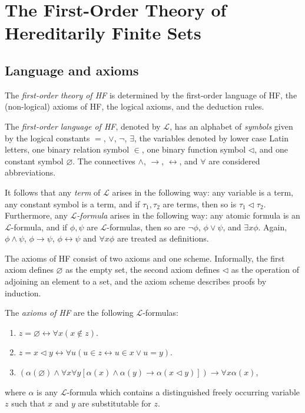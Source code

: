 \chapter{The First-Order Theory of Hereditarily Finite Sets}

\section{Language and axioms}

The \textit{first-order theory of HF} is determined by the first-order language of HF, 
the (non-logical) axioms of HF, the logical axioms, and the deduction rules.

\begin{definition}
    \label{def:Lang}
    \leanok
    The \textit{first-order language of HF}, denoted by $\mathcal{L}$, 
    has an alphabet of \textit{symbols} given by the 
    logical constants $=$, $\lor$, $\neg$, $\exists$, the variables denoted by 
    lower case Latin letters, one binary relation symbol $\in$, one binary function symbol $\lhd$, 
    and one constant symbol $\varnothing$.
    The connectives $\land$, $\rightarrow$, $\leftrightarrow$, and $\forall$ are considered 
    abbreviations.
\end{definition}

It follows that any \textit{term} of $\mathcal{L}$ arises in the following way:
any variable is a term, any constant symbol is a term, and if $\tau_1, \tau_2$ are terms, then so is
$\tau_1 \lhd \tau_2$.
Furthermore, any \textit{$\mathcal{L}$-formula} arises in the following way:
any atomic formula is an $\mathcal{L}$-formula, and if $\phi, \psi$ are $\mathcal{L}$-formulas, 
then so are $\neg \phi$, $\phi \lor \psi$, and $\exists x \phi$.
Again, $\phi \land \psi$, $\phi \rightarrow \psi$, $\phi \leftrightarrow \psi$ and
$\forall x \phi$ are treated as definitions.

The axioms of HF consist of two axioms and one scheme. 
Informally, the first axiom defines $\varnothing$ as the
empty set, the second axiom defines $\lhd$ as the operation of adjoining an element to a set,
and the axiom scheme describes proofs by induction.

\begin{definition}
    \label{def:Axioms}
    \leanok
    The \textit{axioms of HF} are the following $\mathcal{L}$-formulas:
    \begin{enumerate}
        \item $z=\varnothing \leftrightarrow \forall x(x \notin z)$.
        \item $z=x \lhd y \leftrightarrow \forall u(u \in z \leftrightarrow u \in x \lor u=y)$.
        \item $(\alpha(\varnothing) \land \forall x \forall y[\alpha(x) \land \alpha(y) \rightarrow 
        \alpha(x \lhd y)]) \rightarrow \forall x \alpha(x)$,
    \end{enumerate}
    where $\alpha$ is any $\mathcal{L}$-formula which contains a 
    distinguished freely occurring variable $z$ such that $x$ and $y$ are substitutable for $z$.
\end{definition}

